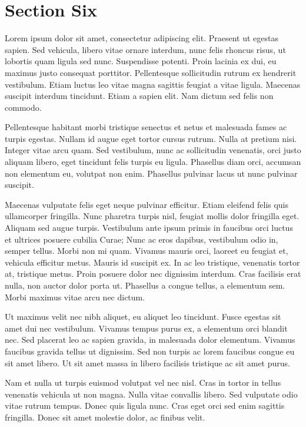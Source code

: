 \documentclass[runningheads,a4paper]{llncs}
\begin{document}
\section{Section Six}
%
Lorem ipsum dolor sit amet, consectetur adipiscing elit. Praesent ut egestas sapien. Sed vehicula, libero vitae ornare interdum, nunc felis rhoncus risus, ut lobortis quam ligula sed nunc. Suspendisse potenti. Proin lacinia ex dui, eu maximus justo consequat porttitor. Pellentesque sollicitudin rutrum ex hendrerit vestibulum. Etiam luctus leo vitae magna sagittis feugiat a vitae ligula. Maecenas suscipit interdum tincidunt. Etiam a sapien elit. Nam dictum sed felis non commodo.

Pellentesque habitant morbi tristique senectus et netus et malesuada fames ac turpis egestas. Nullam id augue eget tortor cursus rutrum. Nulla at pretium nisi. Integer vitae arcu quam. Sed vestibulum, nunc ac sollicitudin venenatis, orci justo aliquam libero, eget tincidunt felis turpis eu ligula. Phasellus diam orci, accumsan non elementum eu, volutpat non enim. Phasellus pulvinar lacus ut nunc pulvinar suscipit.

Maecenas vulputate felis eget neque pulvinar efficitur. Etiam eleifend felis quis ullamcorper fringilla. Nunc pharetra turpis nisl, feugiat mollis dolor fringilla eget. Aliquam sed augue turpis. Vestibulum ante ipsum primis in faucibus orci luctus et ultrices posuere cubilia Curae; Nunc ac eros dapibus, vestibulum odio in, semper tellus. Morbi non mi quam. Vivamus mauris orci, laoreet eu feugiat et, vehicula efficitur metus. Mauris id suscipit ex. In ac leo tristique, venenatis tortor at, tristique metus. Proin posuere dolor nec dignissim interdum. Cras facilisis erat nulla, non auctor dolor porta ut. Phasellus a congue tellus, a elementum sem. Morbi maximus vitae arcu nec dictum.

Ut maximus velit nec nibh aliquet, eu aliquet leo tincidunt. Fusce egestas sit amet dui nec vestibulum. Vivamus tempus purus ex, a elementum orci blandit nec. Sed placerat leo ac sapien gravida, in malesuada dolor elementum. Vivamus faucibus gravida tellus ut dignissim. Sed non turpis ac lorem faucibus congue eu sit amet libero. Ut sit amet massa in libero facilisis tristique ac sit amet purus.

Nam et nulla ut turpis euismod volutpat vel nec nisl. Cras in tortor in tellus venenatis vehicula ut non magna. Nulla vitae convallis libero. Sed vulputate odio vitae rutrum tempus. Donec quis ligula nunc. Cras eget orci sed enim sagittis fringilla. Donec sit amet molestie dolor, ac finibus velit.
%
\newpage
%


%
\newpage
%
\appendix
\end{document}

